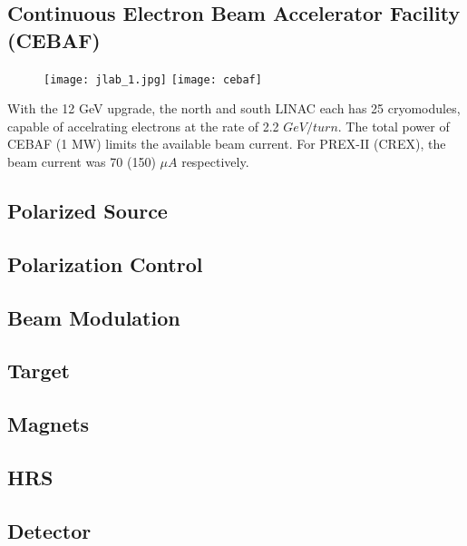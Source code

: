 \subsection{Continuous Electron Beam Accelerator Facility (CEBAF)}
\begin{figure}
    \texttt{[image: jlab\_1.jpg]}
    \texttt{[image: cebaf]}
\end{figure}
With the 12 GeV upgrade, the north and south LINAC each has 25 cryomodules, 
capable of accelrating electrons at the rate of 2.2 $GeV/turn$. The total power
of CEBAF (1 MW) limits the available beam current. For PREX-II (CREX), 
the beam current was 70 (150) $\mu A$ respectively.

\subsection{Polarized Source}

\subsection{Polarization Control}

\subsection{Beam Modulation}

\subsection{Target}

\subsection{Magnets}

\subsection{HRS}

\subsection{Detector}
